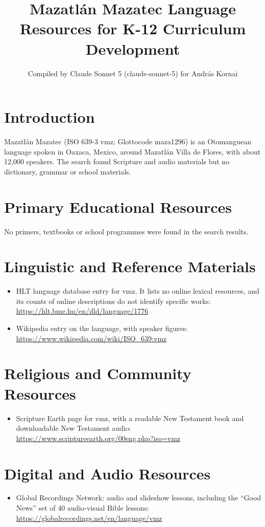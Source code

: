 \documentclass[12pt]{article}
\title{Mazatl\'an Mazatec Language Resources for K-12 Curriculum Development}
\author{Compiled by Claude Sonnet 5 (claude-sonnet-5) for Andr\'as Kornai}
\date{}
\begin{document}
\maketitle

\section{Introduction}
Mazatl\'an Mazatec (ISO 639-3 vmz; Glottocode maza1296) is an Otomanguean language spoken in Oaxaca, Mexico, around Mazatl\'an Villa de Flores, with about 12,000 speakers. The search found Scripture and audio materials but no dictionary, grammar or school materials.

\section{Primary Educational Resources}
No primers, textbooks or school programmes were found in the search results.

\section{Linguistic and Reference Materials}
\begin{itemize}
\item HLT language database entry for vmz. It lists no online lexical resources, and its counts of online descriptions do not identify specific works: \url{https://hlt.bme.hu/en/dld/language/1776}
\item Wikipedia entry on the language, with speaker figures: \url{https://www.wikipedia.com/wiki/ISO_639:vmz}
\end{itemize}

\section{Religious and Community Resources}
\begin{itemize}
\item Scripture Earth page for vmz, with a readable New Testament book and downloadable New Testament audio: \url{https://www.scriptureearth.org/00eng.php?iso=vmz}
\end{itemize}

\section{Digital and Audio Resources}
\begin{itemize}
\item Global Recordings Network: audio and slideshow lessons, including the ``Good News'' set of 40 audio-visual Bible lessons: \url{https://globalrecordings.net/en/language/vmz}
\end{itemize}
\end{document}
